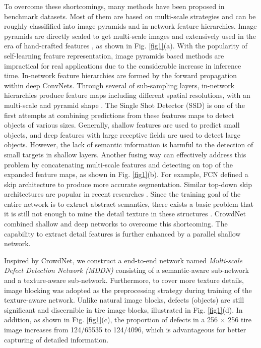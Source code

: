 \documentclass{article}
\begin{document}
To overcome these shortcomings, many methods have been proposed in benchmark datasets. Most of them are based on multi-scale strategies and can be roughly classifified into image pyramids and in-network feature hierarchies. Image pyramids are directly scaled to get multi-scale images and extensively used in the era of hand-crafted features \cite{lowe2004distinctive}, as shown in Fig. \ref{fig1}(a). With the popularity of self-learning feature representation, image pyramids based methods are impractical for real applications due to the considerable increase in inference time. In-network feature hierarchies are formed by the forward propagation within deep ConvNets. Through several of sub-sampling layers, in-network hierarchies produce feature maps including different spatial resolutions, with an multi-scale and pyramid shape \cite{lin2017feature}. The Single Shot Detector (SSD) \cite{liu2016ssd} is one of the first attempts at combining predictions from these features maps to detect objects of various sizes. Generally, shallow features are used to predict small objects, and deep features with large receptive fields are used to detect large objects. However, the lack of semantic information is harmful to the detection of small targets in shallow layers. Another fusing way can effectively address this problem by concatenating multi-scale features and detecting on top of the expanded feature maps, as shown in Fig. \ref{fig1}(b). For example, FCN defined a skip architecture to produce more accurate segmentation. Similar top-down skip architectures are popular in recent researches \cite{newell2016stacked,ghiasi2016laplacian}. Since the training goal of the entire network is to extract abstract semantics, there exists a basic problem that it is still not enough to mine the detail texture in these structures \cite{zhou2018scale}. CrowdNet \cite{boominathan2016crowdnet} combined shallow and deep networks to overcome this shortcoming. The capability to extract detail features is further enhanced by a parallel shallow network.

Inspired by CrowdNet, we construct a end-to-end network named {\it Multi-scale Defect Detection Network (MDDN)} consisting of a semantic-aware sub-network and a texture-aware sub-network. Furthermore, to cover more texture details, image blocking \cite{boominathan2016crowdnet,bai2018sod} was adopted as the preprocessing strategy during training of the texture-aware network. Unlike natural image blocks, defects (objects) are still significant and discernible in tire image blocks, illustrated in Fig. \ref{fig1}(d). In addition, as shown in Fig. \ref{fig1}(c), the proportion of defects in a 256 $\times$ 256 tire image increases from 124/65535 to 124/4096, which is advantageous for better capturing of detailed information.
\end{document}
